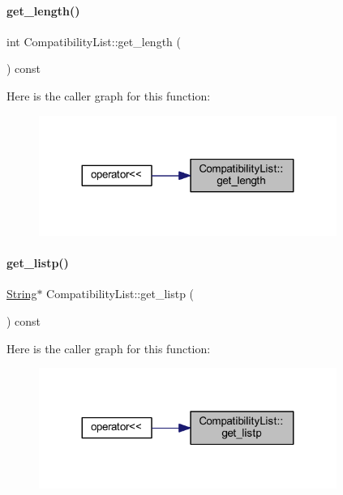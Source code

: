 \paragraph{\texorpdfstring{get\_length()}{get\_length()}}
{\footnotesize\ttfamily int Compatibility\+List\+::get\+\_\+length (\begin{DoxyParamCaption}{ }\end{DoxyParamCaption}) const\hspace{0.3cm}{\ttfamily [inline]}}

Here is the caller graph for this function\+:
\nopagebreak
\begin{figure}[H]
\begin{center}
\leavevmode
\includegraphics[width=275pt]{class_compatibility_list_a44d0f7533b66ced7a957f2846e76c4ec_icgraph}
\end{center}
\end{figure}
\mbox{\label{class_compatibility_list_a16642e17369c398c67b04f549f2f77ac}} 
\paragraph{\texorpdfstring{get\_listp()}{get\_listp()}}
{\footnotesize\ttfamily \mbox{\hyperlink{class_string}{String}}$\ast$ Compatibility\+List\+::get\+\_\+listp (\begin{DoxyParamCaption}{ }\end{DoxyParamCaption}) const\hspace{0.3cm}{\ttfamily [inline]}}

Here is the caller graph for this function\+:
\nopagebreak
\begin{figure}[H]
\begin{center}
\leavevmode
\includegraphics[width=275pt]{class_compatibility_list_a16642e17369c398c67b04f549f2f77ac_icgraph}
\end{center}
\end{figure}
\mbox{\label{class_compatibility_list_a3836f2aaefc1753287dd4d6052e17469}} 
